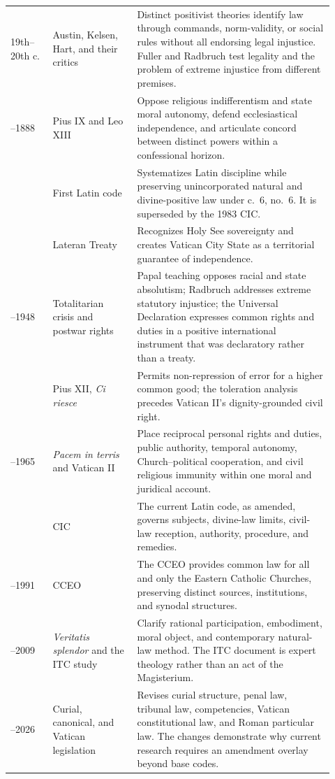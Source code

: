 \begin{longtable}{>{\bfseries\raggedright\arraybackslash}p{0.12\linewidth}>{\raggedright\arraybackslash}p{0.24\linewidth}>{\raggedright\arraybackslash}p{0.56\linewidth}}
19th--20th c. & Austin, Kelsen, Hart, and their critics & Distinct positivist theories identify law through commands, norm-validity, or social rules without all endorsing legal injustice. Fuller and Radbruch test legality and the problem of extreme injustice from different premises.\\
1864--1888 & Pius IX and Leo XIII & Oppose religious indifferentism and state moral autonomy, defend ecclesiastical independence, and articulate concord between distinct powers within a confessional horizon.\\
1917 & First Latin code & Systematizes Latin discipline while preserving unincorporated natural and divine-positive law under c.~6, no.~6. It is superseded by the 1983 CIC.\\
1929 & Lateran Treaty & Recognizes Holy See sovereignty and creates Vatican City State as a territorial guarantee of independence.\\
1937--1948 & Totalitarian crisis and postwar rights & Papal teaching opposes racial and state absolutism; Radbruch addresses extreme statutory injustice; the Universal Declaration expresses common rights and duties in a positive international instrument that was declaratory rather than a treaty.\\
1953 & Pius XII, \emph{Ci riesce} & Permits non-repression of error for a higher common good; the toleration analysis precedes Vatican II's dignity-grounded civil right.\\
1963--1965 & \emph{Pacem in terris} and Vatican II & Place reciprocal personal rights and duties, public authority, temporal autonomy, Church--political cooperation, and civil religious immunity within one moral and juridical account.\\
1983 & CIC & The current Latin code, as amended, governs subjects, divine-law limits, civil-law reception, authority, procedure, and remedies.\\
1990--1991 & CCEO & The CCEO provides common law for all and only the Eastern Catholic Churches, preserving distinct sources, institutions, and synodal structures.\\
1993--2009 & \emph{Veritatis splendor} and the ITC study & Clarify rational participation, embodiment, moral object, and contemporary natural-law method. The ITC document is expert theology rather than an act of the Magisterium.\\
2022--2026 & Curial, canonical, and Vatican legislation & Revises curial structure, penal law, tribunal law, competencies, Vatican constitutional law, and Roman particular law. The changes demonstrate why current research requires an amendment overlay beyond base codes.\\
\bottomrule
\end{longtable}


